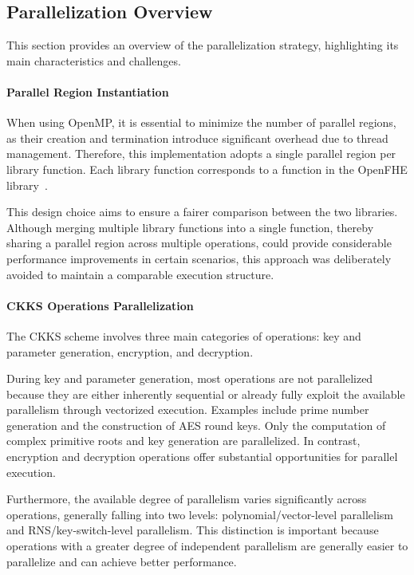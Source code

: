 \subsection{Parallelization Overview}

This section provides an overview of the parallelization strategy, highlighting its main characteristics and challenges.

\paragraph{Parallel Region Instantiation}

When using OpenMP, it is essential to minimize the number of parallel regions, as their creation and termination introduce significant overhead due to thread management. Therefore, this implementation adopts a single parallel region per library function. Each library function corresponds to a function in the OpenFHE library~\cite{al2022openfhe}.

This design choice aims to ensure a fairer comparison between the two libraries. Although merging multiple library functions into a single function, thereby sharing a parallel region across multiple operations, could provide considerable performance improvements in certain scenarios, this approach was deliberately avoided to maintain a comparable execution structure.

\paragraph{CKKS Operations Parallelization}

The CKKS scheme involves three main categories of operations: key and parameter generation, encryption, and decryption.

During key and parameter generation, most operations are not parallelized because they are either inherently sequential or already fully exploit the available parallelism through vectorized execution. Examples include prime number generation and the construction of AES round keys. Only the computation of complex primitive roots and key generation are parallelized. In contrast, encryption and decryption operations offer substantial opportunities for parallel execution.

Furthermore, the available degree of parallelism varies significantly across operations, generally falling into two levels: polynomial/vector-level parallelism and RNS/key-switch-level parallelism. This distinction is important because operations with a greater degree of independent parallelism are generally easier to parallelize and can achieve better performance.

